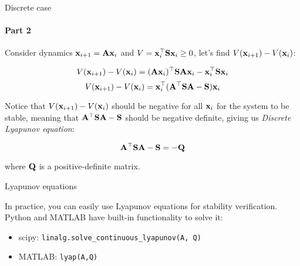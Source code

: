 \documentclass{beamer}
\begin{document}
\begin{frame}{Discrete case}
\framesubtitle{Part 2}
\begin{flushleft}

Consider dynamics $\mathbf{x}_{i+1} = \mathbf{A}\mathbf{x}_i$ and $V = \mathbf{x}_i^\top\mathbf{S}\mathbf{x}_i \geq 0$, let's find $V(\mathbf{x}_{i+1}) - V(\mathbf{x}_i)$:

\begin{equation}
    V(\mathbf{x}_{i+1}) - V(\mathbf{x}_i) = (\mathbf{A}\mathbf{x}_i)^\top\mathbf{S}\mathbf{A}\mathbf{x}_i - 
    \mathbf{x}_i^\top\mathbf{S}\mathbf{x}_i
\end{equation}
\begin{equation}
    V(\mathbf{x}_{i+1}) - V(\mathbf{x}_i) = \mathbf{x}_i^\top(\mathbf{A}^\top\mathbf{S}\mathbf{A} - \mathbf{S})\mathbf{x}_i
\end{equation}

Notice that $V(\mathbf{x}_{i+1}) - V(\mathbf{x}_i)$ should be negative for all $\mathbf{x}_i$ for the system to be stable, meaning that $\mathbf{A}^\top\mathbf{S}\mathbf{A} - \mathbf{S}$ should be negative definite, giving us \emph{Discrete Lyapunov equation}:

\begin{equation}
    \mathbf{A}^\top\mathbf{S}\mathbf{A} - \mathbf{S} = -\mathbf{Q}
\end{equation}

where $\mathbf{Q}$ is a positive-definite matrix.

\end{flushleft}
\end{frame}






\begin{frame}{Lyapunov equations}
\begin{flushleft}

In practice, you can easily use Lyapunov equations for stability verification. Python and MATLAB have built-in functionality to solve it:

\begin{itemize}
    \item scipy: \texttt{linalg.solve\_continuous\_lyapunov(A, Q)}
    \item MATLAB: \texttt{lyap(A,Q)}
\end{itemize}

\end{flushleft}
\end{frame}
\end{document}
